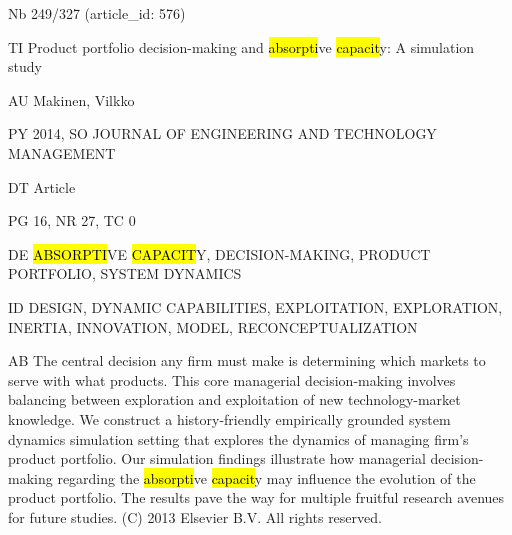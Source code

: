 \documentclass[a4paper]{article}
\begin{document}
\vspace*{-2cm}
Nb \tabto{0cm}249/327 (article\_id: 576)\par
TI \tabto{0cm}Product portfolio decision-making and \hl{absorpti}ve \hl{capacit}y: A simulation study\par
AU \tabto{0cm}Makinen, Vilkko\par
PY \tabto{0cm}2014, SO JOURNAL OF ENGINEERING AND TECHNOLOGY MANAGEMENT\par
DT \tabto{0cm}Article\par
PG \tabto{0cm}16, NR 27, TC 0\par
DE \tabto{0cm}\hl{ABSORPTI}VE \hl{CAPACIT}Y, DECISION-MAKING, PRODUCT PORTFOLIO, SYSTEM DYNAMICS\par
ID \tabto{0cm}DESIGN, DYNAMIC CAPABILITIES, EXPLOITATION, EXPLORATION, INERTIA, INNOVATION, MODEL, RECONCEPTUALIZATION\par
AB \tabto{0cm}The central decision any firm must make is determining which markets to serve with what products. This core managerial decision-making involves balancing between exploration and exploitation of new technology-market knowledge. We construct a history-friendly empirically grounded system dynamics simulation setting that explores the dynamics of managing firm's product portfolio. Our simulation findings illustrate how managerial decision-making regarding the \hl{absorpti}ve \hl{capacit}y may influence the evolution of the product portfolio. The results pave the way for multiple fruitful research avenues for future studies. (C) 2013 Elsevier B.V. All rights reserved.\par
\clearpage
\end{document}
